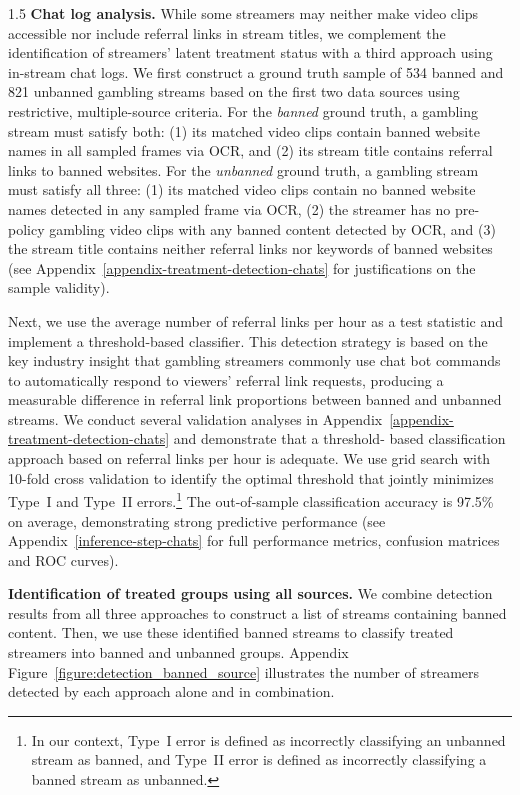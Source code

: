\documentclass[a4paper,12pt]{article}
\begin{document}
\begin{spacing}{1.5}
\noindent \textbf{Chat log analysis.} While some streamers may neither make video clips accessible nor include referral links in stream titles, we complement the identification of streamers' latent treatment status with a third approach using in-stream chat logs. We first construct a ground truth sample of 534 banned and 821 unbanned gambling streams based on the first two data sources using restrictive, multiple-source criteria. For the \textit{banned} ground truth, a gambling stream must satisfy both: (1) its matched video clips contain banned website names in all sampled frames via OCR, and (2) its stream title contains referral links to banned websites. For the \textit{unbanned} ground truth, a gambling stream must satisfy all three: (1) its matched video clips contain no banned website names detected in any sampled frame via OCR, (2) the streamer has no pre-policy gambling video clips with any banned content detected by OCR, and (3) the stream title contains neither referral links nor keywords of banned websites (see Appendix~\ref{appendix-treatment-detection-chats} for justifications on the sample validity). 

Next, we use the average number of referral links per hour as a test statistic and implement a threshold-based classifier. 
This detection strategy is based on the key industry insight that gambling streamers commonly use chat bot commands to automatically respond to viewers' referral link requests, producing a measurable difference in referral link proportions between banned and unbanned streams. We conduct several validation analyses in Appendix~\ref{appendix-treatment-detection-chats} and demonstrate that a threshold-
based classification approach based on referral links per hour is adequate. We use grid search with 10-fold cross validation to identify the optimal threshold that jointly minimizes Type~I and Type~II errors.\footnote{In our context, Type~I error is defined as incorrectly classifying an unbanned stream as banned, and Type~II error is defined as incorrectly classifying a banned stream as unbanned.} The out-of-sample classification accuracy is 97.5\% on average, demonstrating strong predictive performance (see Appendix~\ref{inference-step-chats} for full performance metrics, confusion matrices and ROC curves).

\noindent \textbf{Identification of treated groups using all sources.} We combine detection results from all three approaches to construct a list of streams containing banned content. Then, we use these identified banned streams to classify treated streamers into banned and unbanned groups.  Appendix Figure~\ref{figure:detection_banned_source} illustrates the number of streamers detected by each approach alone and in combination. 


\end{spacing}
\end{document}
